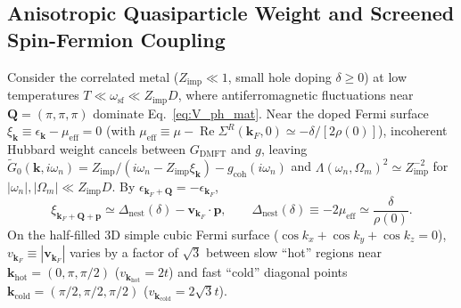 \documentclass[11pt,a4paper]{article}
\numberwithin{equation}{section}
\theoremstyle{plain}
\theoremstyle{definition}
\providecommand{\vk}{\mathbf{k}}
\providecommand{\vp}{\mathbf{p}}
\providecommand{\vQ}{\mathbf{Q}}
\providecommand{\vv}{\mathbf{v}}
\providecommand{\re}{\operatorname{Re}}
\begin{document}
\subsection{Anisotropic Quasiparticle Weight and Screened Spin-Fermion Coupling}
\label{sec:Z_k}

Consider the correlated metal ($Z_{\mathrm{imp}} \ll 1$, small hole doping $\delta \ge 0$)
at low temperatures $T \ll \omega_{\mathrm{sf}} \ll Z_{\mathrm{imp}}D$, where
antiferromagnetic fluctuations near $\vQ = (\pi,\pi,\pi)$ dominate Eq.~\eqref{eq:V_ph_mat}.
Near the doped Fermi surface $\xi_{\vk} \equiv \epsilon_{\vk} - \mu_{\mathrm{eff}} = 0$
(with $\mu_{\mathrm{eff}} \equiv \mu - \re\Sigma^R(\vk_F,0) \simeq -\delta/[2\rho(0)]$),
incoherent Hubbard weight cancels between $G_{\mathrm{DMFT}}$ and $g$, leaving
$\tilde{G}_0(\vk,i\omega_n) = Z_{\mathrm{imp}}/(i\omega_n - Z_{\mathrm{imp}}\xi_{\vk}) - g_{\mathrm{coh}}(i\omega_n)$
and $\Lambda(\omega_n,\Omega_m)^2 \simeq Z_{\mathrm{imp}}^{-2}$ for
$|\omega_n|,|\Omega_m| \ll Z_{\mathrm{imp}}D$. By $\epsilon_{\vk_F+\vQ} = -\epsilon_{\vk_F}$,
\begin{equation}
    \xi_{\vk_F + \vQ + \vp} \simeq \Delta_{\mathrm{nest}}(\delta) - \vv_{\vk_F}\cdot\vp,
    \qquad
    \Delta_{\mathrm{nest}}(\delta) \equiv -2\mu_{\mathrm{eff}} \simeq \frac{\delta}{\rho(0)}.
    \label{eq:detuning}
\end{equation}
On the half-filled 3D simple cubic Fermi surface ($\cos k_x + \cos k_y + \cos k_z = 0$),
$v_{\vk_F} \equiv |\vv_{\vk_F}|$ varies by a factor of $\sqrt{3}$ between slow ``hot''
regions near $\vk_{\mathrm{hot}} = (0,\pi,\pi/2)$ ($v_{\vk_{\mathrm{hot}}} = 2t$) and
fast ``cold'' diagonal points $\vk_{\mathrm{cold}} = (\pi/2,\pi/2,\pi/2)$
($v_{\vk_{\mathrm{cold}}} = 2\sqrt{3}t$).
\end{document}

